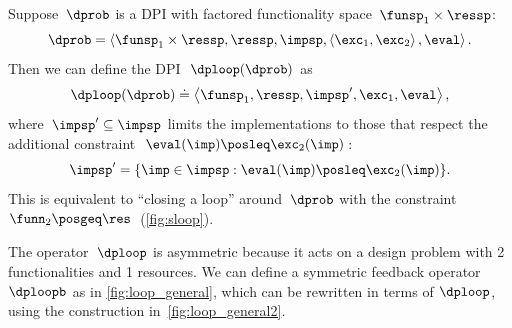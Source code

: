 \begin{definition}[$\dploop$]
\label{def:dp_loop}Suppose~$\dprob$ is a DPI with factored functionality
space~$\funsp_{1}\times\ressp$: 
\[
\dprob=\left\langle \funsp_{1}\times\ressp,\ressp,\impsp,\left\langle \exc_{1},\exc_{2}\right\rangle ,\eval\right\rangle .
\]
Then we can define the DPI~$\dploop(\dprob)$ as 
\[
\dploop(\dprob)\doteq\left\langle \funsp_{1},\ressp,\impsp',\exc_{1},\eval\right\rangle ,
\]
where~$\impsp'\subseteq\impsp$ limits the implementations to those
that respect the additional constraint~$\eval(\imp)\posleq\exc_{2}(\imp)$:
\[
\impsp'=\{\imp\in\impsp:\eval(\imp)\posleq\exc_{2}(\imp)\}.
\]
This is equivalent to ``closing a loop'' around~$\dprob$ with
the constraint~$\funn_{2}\posgeq\res$~(\cref{fig:sloop}).
\end{definition}


The operator~$\dploop$ is asymmetric because it acts on a design
problem with 2 functionalities and 1 resources. We can define a symmetric
feedback operator $\dploopb$ as in \cref{fig:loop_general}, which
can be rewritten in terms of $\dploop$, using the construction in~\cref{fig:loop_general2}\emph{.}


